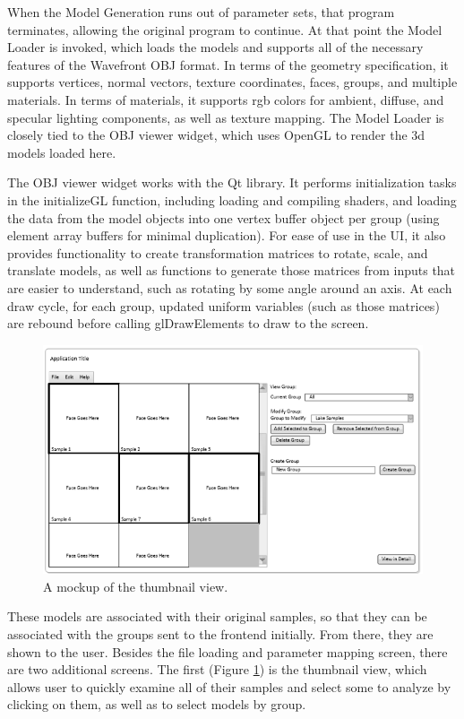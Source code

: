 \documentclass[letterpaper,10pt, onecolumn, draftclsnofoot]{IEEEtran}
\begin{document}
When the Model Generation runs out of parameter sets, that program terminates, allowing the original program to continue. At that point the Model Loader is invoked, which loads the models and supports all of the necessary features of the Wavefront OBJ format. In terms of the geometry specification, it supports vertices, normal vectors, texture coordinates, faces, groups, and multiple materials. In terms of materials, it supports rgb colors for ambient, diffuse, and specular lighting components, as well as texture mapping. The Model Loader is closely tied to the OBJ viewer widget, which uses OpenGL to render the 3d models loaded here.

The OBJ viewer widget works with the Qt library. It performs initialization tasks in the initializeGL function, including loading and compiling shaders, and loading the data from the model objects into one vertex buffer object per group (using element array buffers for minimal duplication). For ease of use in the UI, it also provides functionality to create transformation matrices to rotate, scale, and translate models, as well as functions to generate those matrices from inputs that are easier to understand, such as rotating by some angle around an axis. At each draw cycle, for each group, updated uniform variables (such as those matrices) are rebound before calling glDrawElements to draw to the screen.

\begin{figure}[h]
	\includegraphics[width=\textwidth]{thumbnailMenu.PNG}
	\caption{A mockup of the thumbnail view.}
	\label{fig:thumbnail2}
\end{figure}

These models are associated with their original samples, so that they can be associated with the groups sent to the frontend initially. From there, they are shown to the user. Besides the file loading and parameter mapping screen, there are two additional screens. The first (Figure \ref{fig:thumbnail2}) is the thumbnail view, which allows user to quickly examine all of their samples and select some to analyze by clicking on them, as well as to select models by group.
\end{document}
